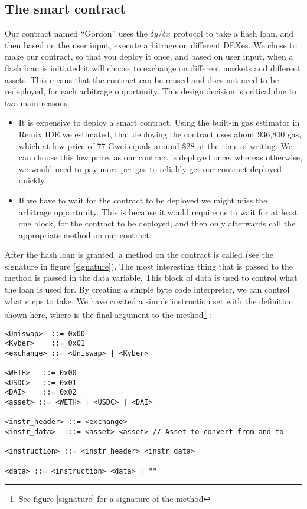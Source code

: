 \subsection{The smart contract}
Our contract named ``Gordon'' uses the $\delta y/\delta x$ protocol to take a
flash loan, and then based on the user input, execute arbitrage on different
DEXes. We chose to make our contract, so that you deploy it once, and based on
user input, when a flash loan is initiated it will choose to exchange on
different markets and different assets. This means that the contract can be
reused and does not need to be redeployed, for each arbitrage opportunity. This
design decision is critical due to two main reasons.
\begin{itemize}
    \item It is expensive to deploy a smart contract. Using the built-in gas
        estimator in Remix IDE we estimated, that deploying the contract uses
        about 936,800 gas, which at low price of 77 Gwei equals around
        \$28 at the time of writing. We can choose this low price, as our
        contract is deployed once, whereas otherwise, we would need to pay more
        per gas to reliably get our contract deployed quickly.
    \item If we have to wait for the contract to be deployed we might miss the
        arbitrage opportunity. This is because it would require us to wait for
        at least one block, for the contract to be deployed, and then only
        afterwards call the appropriate method on our contract.
\end{itemize}

\noindent After the flash loan is granted, a method on the contract is called
(see the signature in figure \ref{signature}). The most interesting thing that
is passed to the method is passed in the data variable. This block of data is
used to control what the loan is used for. By creating a simple byte code
interpreter, we can control what steps to take. We have created a simple
instruction set with the definition shown here, where  is the final
argument to the method\footnote{See figure \ref{signature} for a signature of
the method} :

\begin{samepage}
\begin{verbatim}
<Uniswap>  ::= 0x00
<Kyber>    ::= 0x01
<exchange> ::= <Uniswap> | <Kyber>

<WETH>   ::= 0x00
<USDC>   ::= 0x01
<DAI>    ::= 0x02
<asset> ::= <WETH> | <USDC> | <DAI>

<instr_header> ::= <exchange>
<instr_data>   ::= <asset> <asset> // Asset to convert from and to

<instruction> ::= <instr_header> <instr_data>

<data> ::= <instruction> <data> | ""
\end{verbatim}
\end{samepage}


